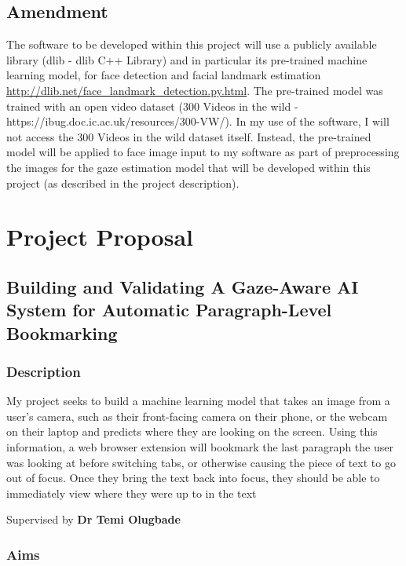 \documentclass{report}
\begin{document}
\section*{Amendment}

The software to be developed within this project will use a publicly available library (dlib - dlib C++ Library) and in particular its pre-trained machine learning model, for face detection and facial landmark estimation \url{http://dlib.net/face_landmark_detection.py.html}. The pre-trained model was trained with an open video dataset (300 Videos in the wild - {https://ibug.doc.ic.ac.uk/resources/300-VW/}). In my use of the software, I will not access the 300 Videos in the wild dataset itself. Instead, the pre-trained model will be applied to face image input to my software as part of preprocessing the images for the gaze estimation model that will be developed within this project (as described in the project description).


\chapter{Project Proposal}

\section*{Building and Validating A Gaze-Aware AI System for Automatic Paragraph-Level Bookmarking}

\subsection*{Description}
My project seeks to build a machine learning model that takes an image from a user's camera, such as their front-facing camera on their phone, or the webcam on their laptop and predicts where they are looking on the screen. Using this information, a web browser extension will bookmark the last paragraph the user was looking at before switching tabs, or otherwise causing the piece of text to go out of focus. Once they bring the text back into focus, they should be able to immediately view where they were up to in the text

\vspace{0.5cm}

\noindent
Supervised by \textbf{Dr Temi Olugbade} 

\vspace{0.5cm}

\subsection*{Aims}
\end{document}
